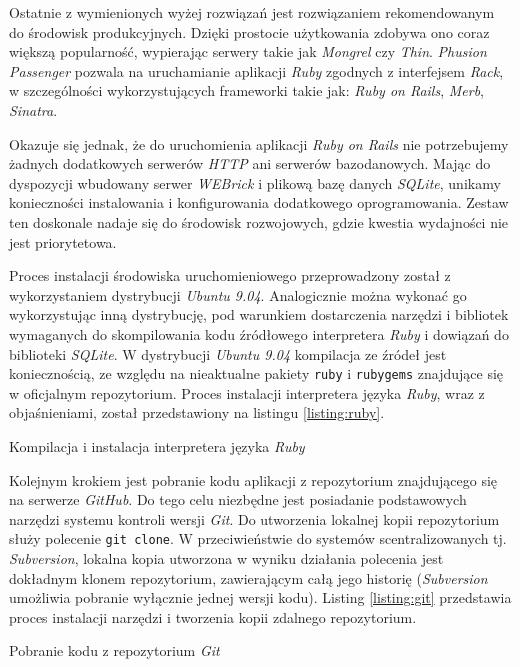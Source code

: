 \documentclass[11pt,twoside]{report}
\begin{document}
Ostatnie z wymienionych wyżej rozwiązań jest rozwiązaniem
rekomendowanym do środowisk produkcyjnych. Dzięki prostocie
użytkowania zdobywa ono coraz większą popularność, wypierając
serwery takie jak \emph{Mongrel} czy \emph{Thin}. \emph{Phusion
  Passenger} pozwala na uruchamianie aplikacji \emph{Ruby} zgodnych z
interfejsem \emph{Rack}, w szczególności wykorzystujących frameworki
takie jak: \emph{Ruby on Rails}, \emph{Merb}, \emph{Sinatra}.

Okazuje się jednak, że do uruchomienia aplikacji \emph{Ruby on Rails}
nie potrzebujemy żadnych dodatkowych serwerów \emph{HTTP} ani serwerów
bazodanowych. Mając do dyspozycji wbudowany serwer \emph{WEBrick} i
plikową bazę danych \emph{SQLite}, unikamy konieczności instalowania i
konfigurowania dodatkowego oprogramowania. Zestaw ten doskonale nadaje
się do środowisk rozwojowych, gdzie kwestia wydajności nie jest
priorytetowa.

Proces instalacji środowiska uruchomieniowego przeprowadzony został z
wykorzystaniem dystrybucji \emph{Ubuntu 9.04}. Analogicznie można
wykonać go wykorzystując inną dystrybucję, pod warunkiem dostarczenia
narzędzi i bibliotek wymaganych do skompilowania kodu źródłowego
interpretera \emph{Ruby} i dowiązań do biblioteki \emph{SQLite}. W
dystrybucji \emph{Ubuntu 9.04} kompilacja ze źródeł jest
koniecznością, ze względu na nieaktualne pakiety \texttt{ruby} i
\texttt{rubygems} znajdujące się w oficjalnym repozytorium. Proces
instalacji interpretera języka \emph{Ruby}, wraz z objaśnieniami,
został przedstawiony na listingu \ref{listing:ruby}.

\begin{listing}
  
  \caption{Kompilacja i instalacja interpretera języka \emph{Ruby}}
  \label{listing:ruby}
\end{listing}

Kolejnym krokiem jest pobranie kodu aplikacji z repozytorium
znajdującego się na serwerze \emph{GitHub}. Do tego celu niezbędne
jest posiadanie podstawowych narzędzi systemu kontroli wersji
\emph{Git}. Do utworzenia lokalnej kopii repozytorium służy polecenie
\texttt{git clone}. W przeciwieństwie do systemów scentralizowanych
tj. \emph{Subversion}, lokalna kopia utworzona w wyniku działania
polecenia jest dokładnym klonem repozytorium, zawierającym całą jego
historię (\emph{Subversion} umożliwia pobranie wyłącznie jednej wersji
kodu). Listing \ref{listing:git} przedstawia proces instalacji
narzędzi i tworzenia kopii zdalnego repozytorium.

\begin{listing}
  
  \caption{Pobranie kodu z repozytorium \emph{Git}}
  \label{listing:git}
\end{listing}
\end{document}
